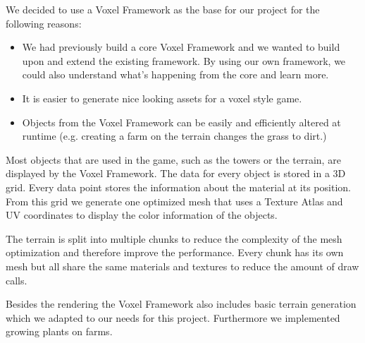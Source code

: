 We decided to use a Voxel Framework as the base for our project for the following reasons:
\begin{itemize}
	\item We had previously build a core Voxel Framework and we wanted to build upon and extend the existing framework. By using our own framework, we could also understand what's happening from the core and learn more.
	\item It is easier to generate nice looking assets for a voxel style game.
	\item Objects from the Voxel Framework can be easily and efficiently altered at runtime (e.g. creating a farm on the terrain changes the grass to dirt.)
\end{itemize}


Most objects that are used in the game, such as the towers or the terrain, are displayed by the Voxel Framework. The data for every object is stored in a 3D grid. Every data point stores the information about the material at its position. From this grid we generate one optimized mesh that uses a Texture Atlas and UV coordinates to display the color information of the objects. 

The terrain is split into multiple chunks to reduce the complexity of the mesh optimization and therefore improve the performance. Every chunk has its own mesh but all share the same materials and textures to reduce the amount of draw calls.

Besides the rendering the Voxel Framework also includes basic terrain generation which we adapted to our needs for this project. Furthermore we implemented growing plants on farms.